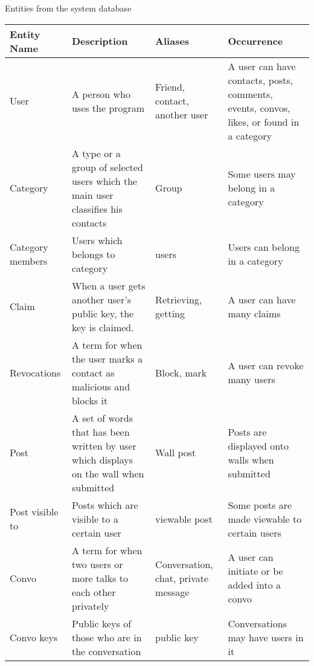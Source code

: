 Entities from the system database
\begin{center}
    \begin{tabular}{| l | l | l | l |}
    \hline
    Entity Name      & Description                                                                                              & Aliases                             & Occurrence                                     \\ \hline
    User             & A person who uses the program                                                                            & Friend, contact, another user       & A user can have contacts, posts, comments, events, convos, likes, or found in a category                                              \\ \hline
    Category         & A type or a group of selected users which the main user classifies his contacts        & Group                               & Some users may belong in a category           \\ \hline
    Category members & Users which belongs to category                                                        & users                             &  Users can belong in a category          \\ \hline
    Claim            & When a user gets another user's public key, the key is claimed.                        & Retrieving, getting                 & A user can have many claims                   \\ \hline
    Revocations      & A term for when the user marks a contact as malicious and blocks it                    & Block, mark                         & A user can revoke many users                  \\ \hline
    Post             & A set of words that has been written by user which displays on the wall when submitted & Wall post                           & Posts are displayed onto walls when submitted \\ \hline
    Post visible to  & Posts which are visible to a certain user  & viewable post                             & Some posts are made viewable to certain users         \\ \hline
    Convo            & A term for when two users or more talks to each other privately                        & Conversation, chat, private message & A user can initiate or be added into a convo  \\ \hline
    Convo keys       & Public keys of those who are in the conversation                                       & public key                        & Conversations may have users in it       \\ \hline

\end{tabular}
\end{center}
